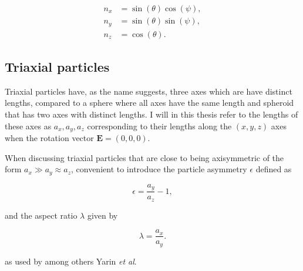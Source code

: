 \begin{subequations}\label{eq:nzEq}
\begin{align}
n_x 	&= \sin(\theta)\cos(\psi), \\
n_y 	&= \sin(\theta)\sin(\psi),\\
n_z		&= \cos(\theta).
\end{align}
\end{subequations}

\subsection{Triaxial particles}
Triaxial particles have, as the name suggests, three axes which are have distinct lengths, compared to a sphere where all axes have the same length and spheroid that has two axes with distinct lengths. I will in this thesis refer to the lengths of these axes as $a_x, a_y, a_z$ corresponding to their lengths along the $(x,y,z)$ axes when the rotation vector $\mathbf{E} = (0,0,0)$. 

When discussing triaxial particles that are close to being axisymmetric of the form $a_x \gg a_y \approx a_z$, convenient to introduce the particle asymmetry $\epsilon$ defined as

\begin{equation}\label{eq:epsilon}
\epsilon = \frac{a_y}{a_z} - 1,
\end{equation}

and the aspect ratio $\lambda$ given by

\begin{equation}\label{eq:lambda}
\lambda = \frac{a_x}{a_y}.
\end{equation}

as used by among others Yarin \emph{et al}\cite{Yarin}.



